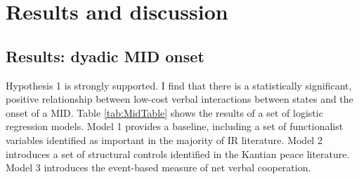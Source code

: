 \documentclass[10pt,]{article}
\let\stdsection\section
\renewcommand\section{\newpage\stdsection}
\begin{document}
\section{Results and discussion}\label{results-and-discussion}

\subsection{Results: dyadic MID onset}\label{results-dyadic-mid-onset}

Hypothesis 1 is strongly supported. I find that there is a statistically
significant, positive relationship between low-cost verbal interactions
between states and the onset of a MID. Table \ref{tab:MidTable} shows
the results of a set of logistic regression models. Model 1 provides a
baseline, including a set of functionalist variables identified as
important in the majority of IR literature. Model 2 introduces a set of
structural controls identified in the Kantian peace literature. Model 3
introduces the event-based measure of net verbal cooperation.
\end{document}
